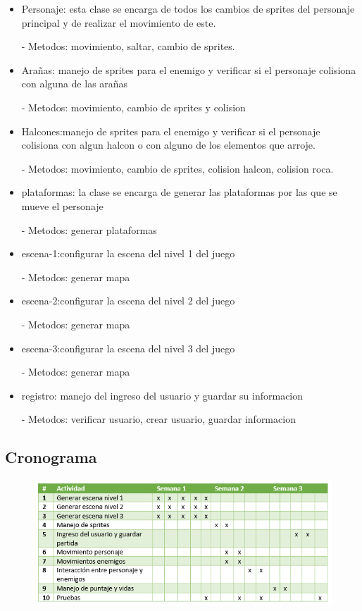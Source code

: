 \documentclass{article}
\begin{document}
\begin{itemize}

    \item Personaje: esta clase se encarga de todos los cambios de sprites del personaje principal y de realizar el movimiento de este.
    
    - Metodos: movimiento, saltar, cambio de sprites.
    
    \item Arañas: manejo de sprites para el enemigo  y verificar si el personaje colisiona con alguna de las arañas
    
    - Metodos: movimiento, cambio de sprites y colision 
    
    \item Halcones:manejo de sprites para el enemigo y verificar si el personaje colisiona con algun halcon o con alguno de los elementos que arroje. 
    
    - Metodos: movimiento, cambio de sprites, colision halcon, colision roca. 
    
    \item plataformas: la clase se encarga de generar las plataformas por las que se mueve el personaje
    
    - Metodos: generar plataformas 
    
    \item escena-1:configurar la escena del nivel 1 del juego
    
    - Metodos: generar mapa
    
    \item escena-2:configurar la escena del nivel 2 del juego 
    
    - Metodos: generar mapa
    
    \item escena-3:configurar la escena del nivel 3 del juego
    
    - Metodos: generar mapa
    
    \item registro: manejo del ingreso del usuario y guardar su informacion
    
    - Metodos: verificar usuario, crear usuario, guardar informacion
    
\end{itemize}
\newpage

\subsection{Cronograma}
\begin{figure}[h]
\includegraphics[width=13cm]{cronograma.PNG}
\centering
\end{figure}
\end{document}
